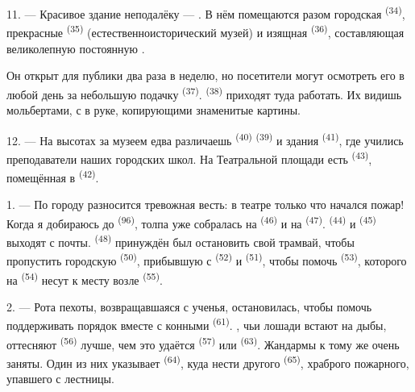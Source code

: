 11. --- Красивое здание неподалёку --- . В нём помещаются
разом городская  \textsuperscript{(34)}, прекрасные
 \textsuperscript{(35)} (естественноисторический
музей) и изящная  \textsuperscript{(36)}, составляющая
великолепную постоянную .

Он открыт для публики два раза в неделю, но посетители могут осмотреть
его в любой день за небольшую подачку  \textsuperscript{(37)}.
 \textsuperscript{(38)} приходят туда работать. Их видишь
 мольбертами, с  в руке, копирующими знаменитые
картины.

12. --- На высотах за музеем едва различаешь  \textsuperscript{(40)}
 \textsuperscript{(39)} и здания 
\textsuperscript{(41)}, где учились преподаватели наших городских школ. На
Театральной площади есть  \textsuperscript{(43)}, помещённая в
 \textsuperscript{(42)}.

\VUsaut{5.0mm}
\VUsaut{3.0mm}

\VUsaut{3.4mm}

1. --- По городу разносится тревожная весть: в театре только что начался
пожар! Когда я добираюсь до  \textsuperscript{(96)}, толпа уже
собралась на  \textsuperscript{(46)} и на 
\textsuperscript{(47)}.  \textsuperscript{(44)} и
 \textsuperscript{(45)} выходят с почты. 
\textsuperscript{(48)} принуждён был остановить свой трамвай, чтобы пропустить
городскую  \textsuperscript{(50)}, прибывшую с
 \textsuperscript{(52)} и  \textsuperscript{(51)},
чтобы помочь  \textsuperscript{(53)}, которого на 
\textsuperscript{(54)} несут к месту возле 
\textsuperscript{(55)}.

2. --- Рота пехоты, возвращавшаяся с ученья, остановилась, чтобы помочь
поддерживать порядок вместе с конными 
\textsuperscript{(61)}. , чьи лошади встают на дыбы, оттесняют
 \textsuperscript{(56)} лучше, чем это удаётся 
\textsuperscript{(57)} или  \textsuperscript{(63)}. Жандармы к тому же
очень заняты. Один из них указывает  \textsuperscript{(64)},
куда нести другого  \textsuperscript{(65)}, храброго
пожарного, упавшего с лестницы.

